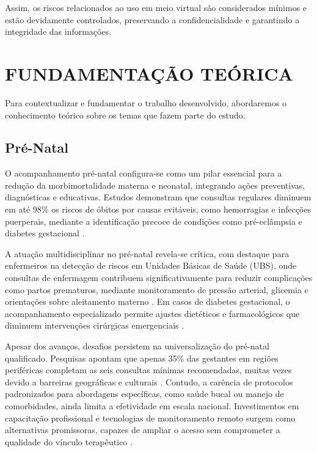 \documentclass[12pt, a4paper]{report}
\theoremstyle{definition}
\theoremstyle{remark}
\theoremstyle{plain}
\begin{document}
Assim, os riscos relacionados ao uso em meio virtual são considerados mínimos e estão devidamente controlados, preservando a confidencialidade e garantindo a integridade das informações. 


\chapter{FUNDAMENTAÇÃO TEÓRICA}
\thispagestyle{myheadings}

Para contextualizar e fundamentar o trabalho desenvolvido, abordaremos o conhecimento teórico sobre os temas que fazem parte do estudo.

\section{Pré-Natal}
O acompanhamento pré-natal configura-se como um pilar essencial para a redução da morbimortalidade materna e neonatal, integrando ações preventivas, diagnósticas e educativas. Estudos demonstram que consultas regulares diminuem em até 98\% os riscos de óbitos por causas evitáveis, como hemorragias e infecções puerperais, mediante a identificação precoce de condições como pré-eclâmpsia e diabetes gestacional \cite{Silva_2025}.

A atuação multidisciplinar no pré-natal revela-se crítica, com destaque para enfermeiros na detecção de riscos em Unidades Básicas de Saúde (UBS), onde consultas de enfermagem contribuem significativamente para reduzir complicações como partos prematuros, mediante monitoramento de pressão arterial, glicemia e orientações sobre aleitamento materno \cite{sousa2024}. Em casos de diabetes gestacional, o acompanhamento especializado permite ajustes dietéticos e farmacológicos que diminuem intervenções cirúrgicas emergenciais \cite{oliveira2025}.

Apesar dos avanços, desafios persistem na universalização do pré-natal qualificado. Pesquisas apontam que apenas 35\% das gestantes em regiões periféricas completam as seis consultas mínimas recomendadas, muitas vezes devido a barreiras geográficas e culturais \cite{Querioz2024}. Contudo, a carência de protocolos padronizados para abordagens específicas, como saúde bucal ou manejo de comorbidades, ainda limita a efetividade em escala nacional. Investimentos em capacitação profissional e tecnologias de monitoramento remoto surgem como alternativas promissoras, capazes de ampliar o acesso sem comprometer a qualidade do vínculo terapêutico \cite{Lima2024}.
\end{document}
